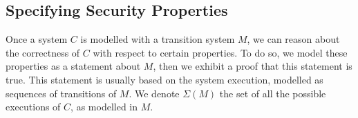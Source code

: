 %
%
%
%
%
%

\subsection{Specifying Security Properties}
\label{subsec:state:secu}

Once a system $C$ is modelled with a transition system $M$, we can reason about
the correctness of $C$ with respect to certain properties.
%
To do so, we model these properties as a statement about $M$, then we exhibit a
proof that this statement is true.
%
This statement is usually based on the system execution, modelled as sequences
of transitions of $M$.
%
We denote $\Sigma(M)$ the set of all the possible executions of $C$, as modelled
in $M$.

